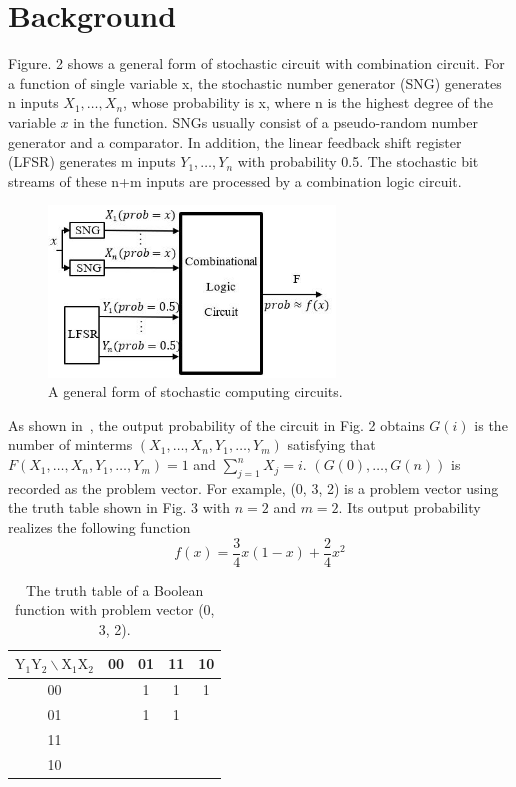 \documentclass[conference,letterpaper]{IEEEtran}
\begin{document}
\section*{Background}
Figure. 2 shows a general form of stochastic circuit with combination circuit. For a function of single variable x, the stochastic number generator (SNG) generates n inputs $X_{1}, \ldots, X_{n}$, whose probability is x, where n is the highest degree of the variable $x$ in the function. SNGs usually consist of a pseudo-random number generator and a comparator. In addition, the linear feedback shift register (LFSR) generates m inputs $Y_{1}, \ldots, Y_{n}$ with probability 0.5. The stochastic bit streams of these n+m inputs are processed by a combination logic circuit.
\begin{figure}[htbp]
	\centering
	\includegraphics[width=3in]{fig/sc6.jpg}	
	\caption{A general form of stochastic computing circuits.} 
\end{figure}

As shown in~\cite{2}, the output probability of the circuit in Fig. 2 obtains $G(i)$ is the number of minterms $(X_{1}, \ldots, X_{n}, Y_{1}, \ldots, Y_{m})$ satisfying that $F(X_{1}, \ldots, X_{n}, Y_{1}, \ldots, Y_{m})=1$ and $\sum_{j=1}^{n} X_{j}=i$. $(G(0), \ldots, G(n))$ is recorded as the problem vector. For example, (0, 3, 2) is a problem vector using the truth table shown in Fig. 3 with $n=2$ and $m=2$. Its output probability realizes the following function
\begin{equation}
f(x)=\frac{3}{4} x(1-x)+\frac{2}{4} x^{2}
\end{equation}

\begin{table}[htbp]
\setlength{\abovecaptionskip}{0.cm}
\setlength{\belowcaptionskip}{0.pt}
\setlength{\tabcolsep}{1mm}
\caption{The truth table of a Boolean function with problem vector (0, 3, 2).}
\centering
\begin{tabular}{|c|c|c|c|c|}
\hline $\mathrm{Y}_{1} \mathrm{Y}_{2} \backslash \mathrm{X}_{1} \mathrm{X}_{2}$ & 00 & 01 & 11 & 10 \\
\hline 00 & & 1 & 1 & 1 \\
\hline 01 & & 1 & 1 & \\
\hline 11 & & & & \\
\hline 10 & & & & \\
\hline
\end{tabular}
\end{table}
\end{document}
